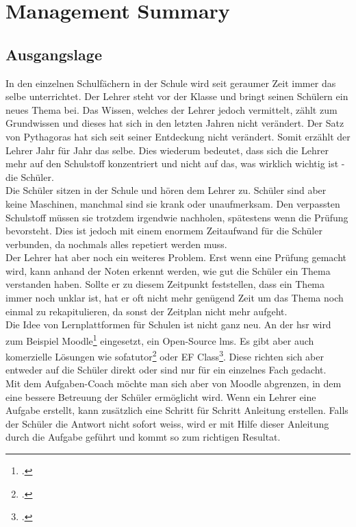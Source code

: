 \section*{Management Summary}

\subsection*{Ausgangslage}
In den einzelnen Schulfächern in der Schule wird seit geraumer Zeit immer das selbe unterrichtet. Der Lehrer steht vor der Klasse und bringt seinen Schülern ein neues Thema bei. Das Wissen, welches der Lehrer jedoch vermittelt, zählt zum Grundwissen und dieses hat sich in den letzten Jahren nicht verändert. Der Satz von Pythagoras hat sich seit seiner Entdeckung nicht verändert. Somit erzählt der Lehrer Jahr für Jahr das selbe. Dies wiederum bedeutet, dass sich die Lehrer mehr auf den Schulstoff konzentriert und nicht auf das, was wirklich wichtig ist - die Schüler. \\

Die Schüler sitzen in der Schule und hören dem Lehrer zu. Schüler sind aber keine Maschinen, manchmal sind sie krank oder unaufmerksam. Den verpassten Schulstoff müssen sie trotzdem irgendwie nachholen, spätestens wenn die Prüfung bevorsteht. Dies ist jedoch mit einem enormem Zeitaufwand für die Schüler verbunden, da nochmals alles repetiert werden muss. \\

Der Lehrer hat aber noch ein weiteres Problem. Erst wenn eine Prüfung gemacht wird, kann anhand der Noten erkennt werden, wie gut die Schüler ein Thema verstanden haben. Sollte er zu diesem Zeitpunkt feststellen, dass ein Thema immer noch unklar ist, hat er oft nicht mehr genügend Zeit um das Thema noch einmal zu rekapitulieren, da sonst der Zeitplan nicht mehr aufgeht. \\

Die Idee von Lernplattformen für Schulen ist nicht ganz neu. An der \gls{hsr} wird zum Beispiel Moodle\footcite{moodle_homepage} eingesetzt, ein Open-Source \gls{lms}. Es gibt aber auch komerzielle Lösungen wie sofatutor\footcite{sofatutor_homepage} oder EF Class\footcite{ef_class_homepage}. Diese richten sich aber entweder auf die Schüler direkt oder sind nur für ein einzelnes Fach gedacht. \\


Mit dem Aufgaben-Coach möchte man sich aber von Moodle abgrenzen, in dem eine bessere Betreuung der Schüler ermöglicht wird. Wenn ein Lehrer eine Aufgabe erstellt, kann zusätzlich eine Schritt für Schritt Anleitung erstellen. Falls der Schüler die Antwort nicht sofort weiss, wird er mit Hilfe dieser Anleitung durch die Aufgabe geführt und kommt so zum richtigen Resultat. 

